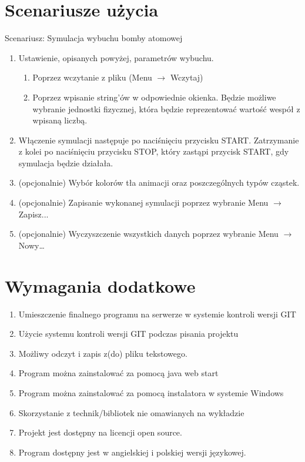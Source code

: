 \documentclass[12pt, a4paper, oneside]{article}
\begin{document}
\section{Scenariusze użycia}
Scenariusz: Symulacja wybuchu bomby atomowej
\begin{enumerate}
    \item Ustawienie, opisanych powyżej, parametrów wybuchu.
    \begin{enumerate}
        \item Poprzez wczytanie z pliku (Menu $\rightarrow$ Wczytaj)
        \item Poprzez wpisanie string’ów w odpowiednie okienka. Będzie możliwe wybranie jednostki fizycznej, która będzie reprezentować wartość wespół z wpisaną liczbą. 
    \end{enumerate}
    \item Włączenie symulacji następuje po naciśnięciu przycisku START. Zatrzymanie z kolei po naciśnięciu przycisku STOP, który zastąpi przycisk START, gdy symulacja będzie działała. 
    \item (opcjonalnie) Wybór kolorów tła animacji oraz poszczególnych typów cząstek.  
    \item (opcjonalnie) Zapisanie wykonanej symulacji poprzez wybranie Menu $\rightarrow$  Zapisz... 
    \item (opcjonalnie) Wyczyszczenie wszystkich danych poprzez wybranie Menu $\rightarrow$  Nowy… 
\end{enumerate}
\section{Wymagania dodatkowe}
\begin{enumerate}
     \item Umieszczenie finalnego programu na serwerze w systemie kontroli wersji GIT  
    \item Użycie systemu kontroli wersji GIT podczas pisania projektu 
    \item Możliwy odczyt i zapis z(do) pliku tekstowego. 
    \item Program można zainstalować za pomocą java web start  
    \item Program można zainstalować za pomocą instalatora w systemie Windows 
    \item Skorzystanie z technik/bibliotek nie omawianych na wykładzie  
    \item Projekt jest dostępny na licencji open source.
    \item Program dostępny jest w angielskiej i polskiej wersji językowej.
\end{enumerate}
\end{document}
